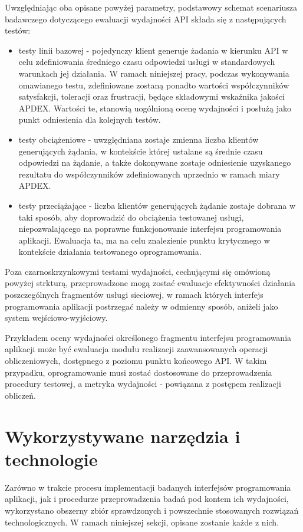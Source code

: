 Uwzględniając oba opisane powyżej parametry, podstawowy schemat scenariusza badawczego dotyczącego ewaluacji wydajności API składa się z następujących testów:
\begin{itemize}
    \item testy linii bazowej - pojedynczy klient generuje żadania w kierunku API w celu zdefiniowania średniego czasu odpowiedzi usługi w standardowych warunkach jej działania. W ramach niniejszej pracy, podczas wykonywania omawianego testu, zdefiniowane zostaną ponadto wartości współczynników satysfakcji, toleracji oraz frustracji, będące składowymi wskaźnika jakości APDEX. Wartości te, stanowią uogólnioną ocenę wydajności i posłużą jako punkt odniesienia dla kolejnych testów.
    \item testy obciążeniowe - uwzględniana zostaje zmienna liczba klientów generujących żądania, w kontekście której ustalane są średnie czasu odpowiedzi na żądanie, a także dokonywane zostaje odniesienie uzyskanego rezultatu do współczynników zdefiniowanych uprzednio w ramach miary APDEX.
    \item testy przeciążające - liczba klientów generujących żądanie zostaje dobrana w taki sposób, aby doprowadzić do obciążenia testowanej usługi, niepozwalającego na poprawne funkcjonowanie interfejsu programowania aplikacji. Ewaluacja ta, ma na celu znalezienie punktu krytycznego w kontekście działania testowanego oprogramowania.
\end{itemize}

Poza czarnoskrzynkowymi testami wydajności, cechującymi się omówioną powyżej strkturą, przeprowadzone mogą zostać ewaluacje efektywności działania poszczególnych fragmentów usługi sieciowej, w ramach których interfejs programowania aplikacji postrzegać należy w odmienny sposób, aniżeli jako system wejściowo-wyjściowy.

Przykładem oceny wydajności określonego fragmentu interfejsu programowania aplikacji może być ewaluacja modułu realizacji zaawansowanych operacji obliczeniowych, dostępnego z poziomu punktu końcowego API. W takim przypadku, oprogramowanie musi zostać dostosowane do przeprowadzenia procedury testowej, a metryka wydajności - powiązana z postępem realizacji obliczeń.
\section{Wykorzystywane narzędzia i technologie}
Zarówno w trakcie procesu implementacji badanych interfejsów programowania aplikacji, jak i procedurze przeprowadzenia badań pod kontem ich wydajności, wykorzystano obszerny zbiór sprawdzonych i powszechnie stosowanych rozwiązań technologicznych. W ramach niniejszej sekcji, opisane zostanie każde z nich.

